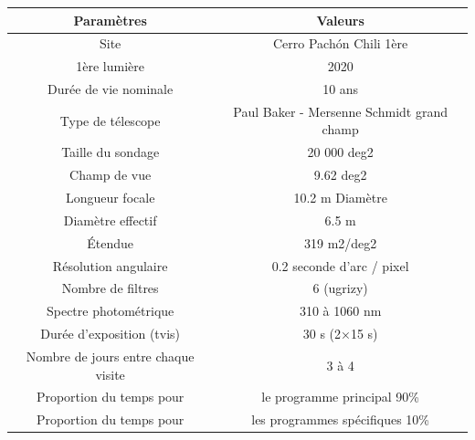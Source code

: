 \newline
\newline
\begin{tabular}{|c|c|}
      \hline
     Paramètres & Valeurs \\
     \hline
     Site & Cerro Pachón Chili 1ère  \\
     \hline
     1ère lumière & 2020 \\
     \hline
     Durée de vie nominale & 10 ans  \\
     \hline
     Type de télescope & Paul Baker - Mersenne Schmidt grand champ  \\
     \hline
     Taille du sondage & 20 000 deg2  \\
     \hline
     Champ de vue & 9.62 deg2 \\
    
     \hline
     Longueur focale & 	10.2 m Diamètre  \\
     \hline
     Diamètre effectif & 6.5 m\\
     \hline
      Étendue & 319 m2/deg2 \\
     \hline
     Résolution angulaire & 0.2 seconde d'arc / pixel  \\
     \hline
     Nombre de filtres & 6 (ugrizy)  \\
     \hline
     Spectre photométrique & 310 à 1060 nm  \\
     \hline
     Durée d'exposition (tvis) & 30 s (2×15 s) \\
     \hline
     Nombre de jours entre chaque visite & 3 à 4   \\
     \hline
     Proportion du temps pour & le programme principal 	90\% \\
     \hline
     Proportion du temps pour & les programmes spécifiques	10\%  \\
     
     \hline
\end{tabular}
\newline
